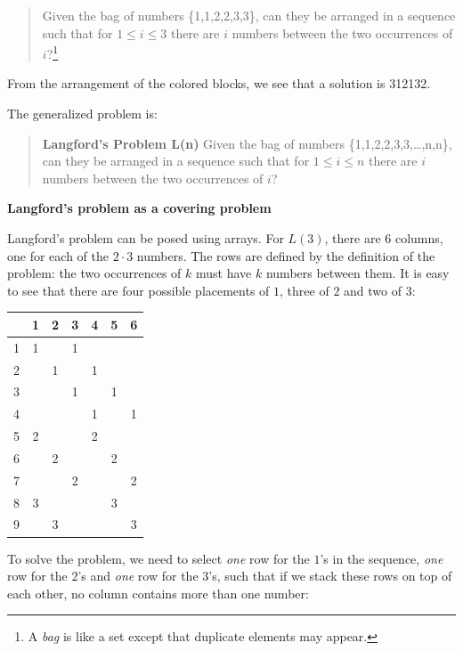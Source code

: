 \documentclass[11pt,a4paper]{report}
\begin{document}
\begin{quote}
Given the bag of numbers \{1,1,2,2,3,3\}, can they be arranged in a sequence such that for $1\leq i \leq 3$ there are $i$ numbers between the two occurrences of $i$?\footnote{A \emph{bag} is like a set except that duplicate elements may appear.}
\end{quote}

From the arrangement of the colored blocks, we see that a solution is 312132.

The generalized problem is:
\begin{quote}
\textbf{Langford's Problem L(n)} Given the bag of numbers \{1,1,2,2,3,3,\ldots,n,n\}, can they be arranged in a sequence such that for $1\leq i \leq n$ there are $i$ numbers between the two occurrences of $i$?
\end{quote}


\begin{center}
\textbf{\Large Langford's problem as a covering problem}
\end{center}


Langford's problem can be posed using arrays. For $L(3)$, there are $6$ columns, one for each of the $2\cdot 3$ numbers. The rows are defined by the definition of the problem: the two occurrences of $k$ must have $k$ numbers between them. It is easy to see that there are four possible placements of $1$, three of $2$ and two of $3$:

\begin{center}
\begin{tabular}{|c||c|c|c|c|c|c|}
\hline
&1&2&3&4&5&6\\\hline\hline
1&1&&1&&&\\\hline
2&&1&&1&&\\\hline
3&&&1&&1&\\\hline
4&&&&1&&1\\\hline
5&2&&&2&&\\\hline
6&&2&&&2&\\\hline
7&&&2&&&2\\\hline
8&3&&&&3&\\\hline
9&&3&&&&3\\\hline
\end{tabular}
\end{center}

To solve the problem, we need to select \emph{one} row for the $1$'s in the sequence, \emph{one} row for the $2$'s and \emph{one} row for the $3$'s, such that if we stack these rows on top of each other, no column contains more than one number:
\end{document}
